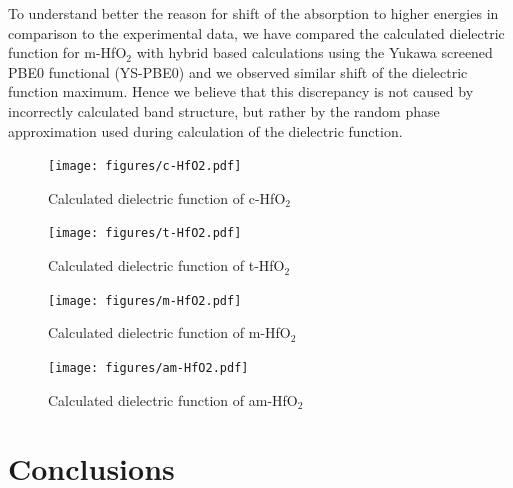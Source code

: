 \documentclass[10pt,a4paper,twocolumn]{article}
\begin{document}
To understand better the reason for shift of the absorption to higher energies in comparison to the experimental data, we have compared the calculated dielectric function for m-HfO$_2$ with hybrid based calculations using the Yukawa screened PBE0 functional (YS-PBE0) \cite{Tran2011} and we observed similar shift of the dielectric function maximum.
Hence we believe that this discrepancy is not caused by incorrectly calculated band structure, but rather by the random phase approximation used during calculation of the dielectric function.


\begin{figure}
\begin{center}
	\texttt{[image: figures/c-HfO2.pdf]}
	\caption{Calculated dielectric function of c-HfO$_2$}
   \label{eps-cHfO2}
\end{center}
\end{figure}

\begin{figure}
\begin{center}
	\texttt{[image: figures/t-HfO2.pdf]}
	\caption{Calculated dielectric function of t-HfO$_2$}
   \label{eps-tHfO2}
\end{center}
\end{figure}

\begin{figure}
\begin{center}
	\texttt{[image: figures/m-HfO2.pdf]}
	\caption{Calculated dielectric function of m-HfO$_2$}
   \label{eps-mHfO2}
\end{center}
\end{figure}

\begin{figure}
\begin{center}
	\texttt{[image: figures/am-HfO2.pdf]}
	\caption{Calculated dielectric function of am-HfO$_2$}
   \label{eps-amHfO2}
\end{center}
\end{figure}


\section{Conclusions}
\end{document}
